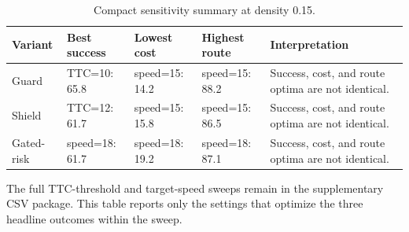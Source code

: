 \begin{table}[!htbp]
\centering
\caption{Compact sensitivity summary at density 0.15.}
\label{tab_sensitivity_summary}
\footnotesize
\setlength{\tabcolsep}{3.0pt}
\renewcommand{\arraystretch}{1.08}
\begin{tabular}{@{}>{\raggedright\arraybackslash}p{}>{\raggedright\arraybackslash}p{}>{\raggedright\arraybackslash}p{}>{\raggedright\arraybackslash}p{}>{\raggedright\arraybackslash}p{}@{}}
\toprule
Variant & Best success & Lowest cost & Highest route & Interpretation \\
\midrule
Guard & TTC=10: 65.8 & speed=15: 14.2 & speed=15: 88.2 & Success, cost, and route optima are not identical. \\
Shield & TTC=12: 61.7 & speed=15: 15.8 & speed=15: 86.5 & Success, cost, and route optima are not identical. \\
Gated-risk & speed=18: 61.7 & speed=18: 19.2 & speed=18: 87.1 & Success, cost, and route optima are not identical. \\
\bottomrule
\end{tabular}
\begin{tablenotes}
\item The full TTC-threshold and target-speed sweeps remain in the supplementary CSV package. This table reports only the settings that optimize the three headline outcomes within the sweep.
\end{tablenotes}
\end{table}
